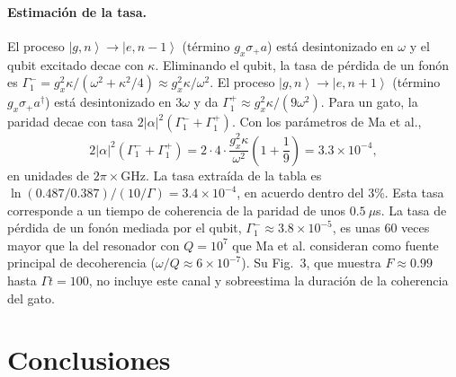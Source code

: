\documentclass[11pt]{report}
\newcommand{\ket}[1]{\left|#1\right\rangle}
\newcommand{\spl}{\sigma_{+}}
\begin{document}
\paragraph{Estimaci\'on de la tasa.} El proceso $\ket{g,n}\to\ket{e,n-1}$ (t\'ermino $g_{x}\spl a$) est\'a desintonizado en $\omega$ y el qubit excitado decae con $\kappa$. Eliminando el qubit, la tasa de p\'erdida de un fon\'on es $\Gamma_{1}^{-}=g_{x}^{2}\kappa/(\omega^{2}+\kappa^{2}/4)\approx g_{x}^{2}\kappa/\omega^{2}$. El proceso $\ket{g,n}\to\ket{e,n+1}$ (t\'ermino $g_{x}\spl a^{\dagger}$) est\'a desintonizado en $3\omega$ y da $\Gamma_{1}^{+}\approx g_{x}^{2}\kappa/(9\omega^{2})$. Para un gato, la paridad decae con tasa $2|\alpha|^{2}(\Gamma_{1}^{-}+\Gamma_{1}^{+})$. Con los par\'ametros de Ma et al.,
\begin{equation}
2|\alpha|^{2}\left(\Gamma_{1}^{-}+\Gamma_{1}^{+}\right) = 2\cdot4\cdot\frac{g_{x}^{2}\kappa}{\omega^{2}}\left(1+\frac{1}{9}\right) = 3.3\times10^{-4},
\end{equation}
en unidades de $2\pi\times$GHz. La tasa extra\'ida de la tabla es $\ln(0.487/0.387)/(10/\Gamma)=3.4\times10^{-4}$, en acuerdo dentro del 3\%. Esta tasa corresponde a un tiempo de coherencia de la paridad de unos $0.5~\mu$s. La tasa de p\'erdida de un fon\'on mediada por el qubit, $\Gamma_{1}^{-}\approx3.8\times10^{-5}$, es unas 60 veces mayor que la del resonador con $Q=10^{7}$ que Ma et al. consideran como fuente principal de decoherencia ($\omega/Q\approx6\times10^{-7}$). Su Fig.~3, que muestra $F\approx0.99$ hasta $\Gamma t=100$, no incluye este canal y sobreestima la duraci\'on de la coherencia del gato.


\section{Conclusiones}
\end{document}
